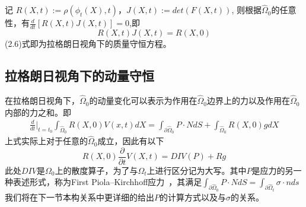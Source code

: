 记 $R(X,t):=\rho(\phi_t(X),t)$，$J(X,t):=det(F(X,t))$, 则根据$\hat{\Omega}_0$的任意性，有$\frac{d}{dt}[R(X,t)J(X,t)] = 0$,即
\begin{equation}
    R(X,t)J(X,t) = R(X,0)
\end{equation}
(2.6)式即为拉格朗日视角下的质量守恒方程。
\subsection{拉格朗日视角下的动量守恒}
在拉格朗日视角下，$\hat{\Omega}_{0}$的动量变化可以表示为作用在$\hat{\Omega}_{0}$边界上的力以及作用在$\hat{\Omega}_{0}$
内部的力之和。即
\begin{equation}
    \begin{split}
        \frac{d}{dt}\Big |_{t = t_0}\int_{\hat{\Omega}_0}R(X,0)V(x,t)dX = \int_{\partial \hat{\Omega}_{0}} P \cdot N dS + \int_{\hat{\Omega}_{0}} R(X,0) g dX
    \end{split}
\end{equation}
上式实际上对于任意的$\hat{\Omega}_0$成立，因此有以下
\begin{equation}
    R(X,0)\frac{\partial}{\partial t} V(X,t) = DIV(P) + Rg
\end{equation}
此处$DIV$是$\Omega_0$上的散度算子，为了与$\Omega_t$上进行区分记为大写。其中$P$是应力的另一种表述形式，称为First Piola–Kirchhoff应力~\cite{gonzalez2008first}，其满足$\int_{\partial \hat{\Omega}_{0}} P \cdot N dS = \int_{\partial \hat{\Omega}_{t}} \sigma \cdot n ds$
我们将在下一节本构关系中更详细的给出$P$的计算方式以及与$\sigma$的关系。 

